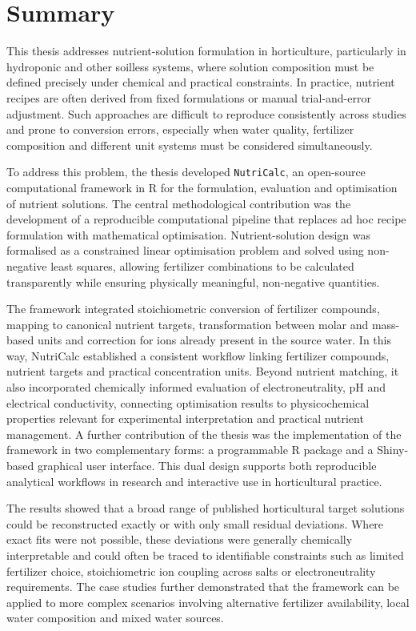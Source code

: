 \documentclass[
  letterpaper,
  DIV=11,
  numbers=noendperiod]{scrreprt}
\begin{document}
\chapter{Summary}\label{summary}

This thesis addresses nutrient-solution formulation in horticulture,
particularly in hydroponic and other soilless systems, where solution
composition must be defined precisely under chemical and practical
constraints. In practice, nutrient recipes are often derived from fixed
formulations or manual trial-and-error adjustment. Such approaches are
difficult to reproduce consistently across studies and prone to
conversion errors, especially when water quality, fertilizer composition
and different unit systems must be considered simultaneously.

To address this problem, the thesis developed \texttt{NutriCalc}, an
open-source computational framework in R for the formulation, evaluation
and optimisation of nutrient solutions. The central methodological
contribution was the development of a reproducible computational
pipeline that replaces ad hoc recipe formulation with mathematical
optimisation. Nutrient-solution design was formalised as a constrained
linear optimisation problem and solved using non-negative least squares,
allowing fertilizer combinations to be calculated transparently while
ensuring physically meaningful, non-negative quantities.

The framework integrated stoichiometric conversion of fertilizer
compounds, mapping to canonical nutrient targets, transformation between
molar and mass-based units and correction for ions already present in
the source water. In this way, NutriCalc established a consistent
workflow linking fertilizer compounds, nutrient targets and practical
concentration units. Beyond nutrient matching, it also incorporated
chemically informed evaluation of electroneutrality, pH and electrical
conductivity, connecting optimisation results to physicochemical
properties relevant for experimental interpretation and practical
nutrient management. A further contribution of the thesis was the
implementation of the framework in two complementary forms: a
programmable R package and a Shiny-based graphical user interface. This
dual design supports both reproducible analytical workflows in research
and interactive use in horticultural practice.

The results showed that a broad range of published horticultural target
solutions could be reconstructed exactly or with only small residual
deviations. Where exact fits were not possible, these deviations were
generally chemically interpretable and could often be traced to
identifiable constraints such as limited fertilizer choice,
stoichiometric ion coupling across salts or electroneutrality
requirements. The case studies further demonstrated that the framework
can be applied to more complex scenarios involving alternative
fertilizer availability, local water composition and mixed water
sources.
\end{document}
